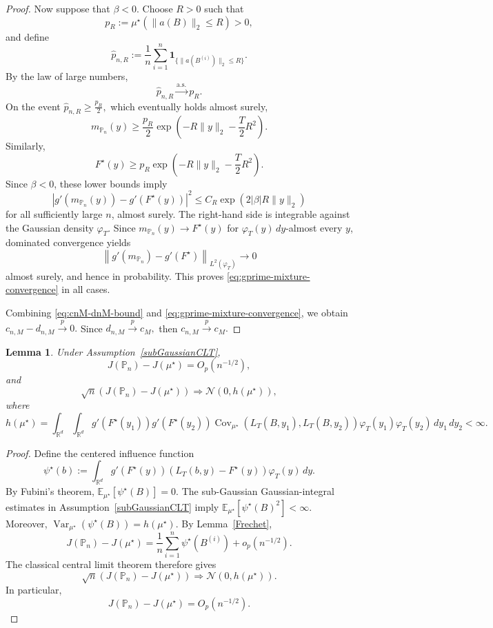 \documentclass[11pt]{article}
\newtheorem{lemma}{Lemma}
\theoremstyle{definition}
\newcommand{\E}{\mathbb{E}}
\begin{document}
\begin{proof}
Now suppose that $\beta<0$. Choose $R>0$ such that
\[
p_R
:=
\mu^\star
\left(
\|a(B)\|_2\leq R
\right)
>0,
\]
and define
\[
\widehat p_{n,R}
:=
\frac1n
\sum_{i=1}^n
\mathbf 1_{\{\|a(B^{(i)})\|_2\leq R\}}.
\]
By the law of large numbers,
\[
\widehat p_{n,R}
\xrightarrow{\mathrm{a.s.}}
p_R.
\]
On the event $\widehat p_{n,R}\geq\frac{p_R}{2},$
which eventually holds almost surely,
\[
m_{\mathbb P_n}(y)
\geq
\frac{p_R}{2}
\exp\!\left(
-R\|y\|_2-\frac{T}{2}R^2
\right).
\]
Similarly,
\[
F^\star(y)
\geq
p_R
\exp\!\left(
-R\|y\|_2-\frac{T}{2}R^2
\right).
\]
Since $\beta<0$, these lower bounds imply
\[
\left|
g'\!\left(m_{\mathbb P_n}(y)\right)
-
g'\!\left(F^\star(y)\right)
\right|^2
\leq
C_R
\exp\!\left(
2|\beta|R\|y\|_2
\right)
\]
for all sufficiently large $n$, almost surely. The right-hand side is
integrable against the Gaussian density $\varphi_T$. Since $m_{\mathbb P_n}(y)
\longrightarrow
F^\star(y)$
for $\varphi_T(y)\,dy$-almost every $y$, dominated convergence yields
\[
\left\|
g'\!\left(m_{\mathbb P_n}\right)
-
g'\!\left(F^\star\right)
\right\|_{L^2(\varphi_T)}
\longrightarrow0
\]
almost surely, and hence in probability. This proves
\eqref{eq:gprime-mixture-convergence} in all cases.

Combining \eqref{eq:cnM-dnM-bound} and
\eqref{eq:gprime-mixture-convergence}, we obtain $c_{n,M}-d_{n,M}
\xrightarrow{p}0.$
Since $d_{n,M}\xrightarrow{p}c_M,$
then $c_{n,M}\xrightarrow{p}c_M.$
\end{proof}


\begin{lemma}\label{JCLT}
Under Assumption~\ref{subGaussianCLT},
\[
J(\mathbb P_n)-J(\mu^\star)
=
O_p(n^{-1/2}),
\]
and
\[
\sqrt n
\left(
J(\mathbb P_n)-J(\mu^\star)
\right)
\Rightarrow
\mathcal N\!\left(
0,h(\mu^\star)
\right),
\]
where
\[
h(\mu^\star)
=
\int_{\mathbb R^d}\int_{\mathbb R^d}
g'\!\left(F^\star(y_1)\right)
g'\!\left(F^\star(y_2)\right)
\operatorname{Cov}_{\mu^\star}
\left(
L_T(B,y_1),
L_T(B,y_2)
\right)
\varphi_T(y_1)\varphi_T(y_2)
\,dy_1\,dy_2
<\infty.
\]
\end{lemma}

\begin{proof}
Define the centered influence function
\[
\psi^\star(b)
:=
\int_{\mathbb R^d}
g'\!\left(F^\star(y)\right)
\left(
L_T(b,y)-F^\star(y)
\right)
\varphi_T(y)\,dy.
\]
By Fubini's theorem, $\E_{\mu^\star}
\left[
\psi^\star(B)
\right]
=0.$
The sub-Gaussian Gaussian-integral estimates in
Assumption~\ref{subGaussianCLT} imply $\E_{\mu^\star}
\left[
\psi^\star(B)^2
\right]
<\infty.$
Moreover, $\operatorname{Var}_{\mu^\star}
\left(
\psi^\star(B)
\right)
=
h(\mu^\star).$
By Lemma~\ref{Frechet},
\[
J(\mathbb P_n)-J(\mu^\star)
=
\frac1n
\sum_{i=1}^n
\psi^\star(B^{(i)})
+
o_p(n^{-1/2}).
\]
The classical central limit theorem therefore gives
\[
\sqrt n
\left(
J(\mathbb P_n)-J(\mu^\star)
\right)
\Rightarrow
\mathcal N
\left(
0,h(\mu^\star)
\right).
\]
In particular,
\[
J(\mathbb P_n)-J(\mu^\star)
=
O_p(n^{-1/2}).
\]
\end{proof}
\end{document}
